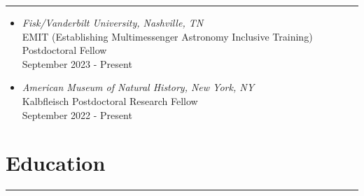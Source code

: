 \documentclass[letterpaper,10pt]{article}
\begin{document}
\hrule
\vspace{.3 cm}
\begin{itemize}[label=$\blacktriangleright$]


 \item \emph{Fisk/Vanderbilt University, Nashville, TN}\\
 EMIT (Establishing Multimessenger Astronomy Inclusive Training) Postdoctoral Fellow \\
 September 2023 - Present



 \item \emph{American Museum of Natural History, New York, NY}\\
 Kalbfleisch Postdoctoral Research Fellow \\
 September 2022 - Present

\end{itemize}



\section*{Education}

\hrule
\vspace{.3 cm}
\end{document}
